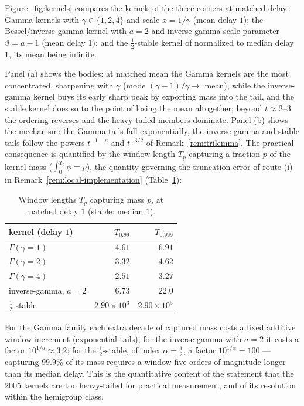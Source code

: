 \begin{example}\label{ex:tail-contrast}
Figure~\ref{fig:kernels} compares the kernels of the three corners at matched delay: Gamma
kernels with $\gamma \in \{1, 2, 4\}$ and scale $x = 1/\gamma$ (mean delay $1$); the
Bessel/inverse-gamma kernel with $a = 2$ and inverse-gamma scale parameter $\vartheta = a - 1$ (mean delay $1$); and the
$\tfrac12$-stable kernel of  normalized to median delay $1$,
its mean being infinite.


Panel (a) shows the bodies: at matched mean the Gamma kernels are the most concentrated,
sharpening with $\gamma$ (mode $(\gamma - 1)/\gamma \to$ mean), while the inverse-gamma
kernel buys its early sharp peak by exporting mass into the tail, and the stable kernel does
so to the point of losing the mean altogether; beyond $t \approx 2$--$3$ the ordering
reverses and the heavy-tailed members dominate. Panel (b) shows the mechanism: the Gamma
tails fall exponentially, the inverse-gamma and stable tails follow the powers $t^{-1-a}$ and
$t^{-3/2}$ of Remark~\ref{rem:trilemma}. The practical consequence is quantified by the
window length $T_p$ capturing a fraction $p$ of the kernel mass ($\int_0^{T_p}\phi = p$), the
quantity governing the truncation error of route (i) in
Remark~\ref{rem:local-implementation} (Table~\ref{tab:windows-mean}):

\begin{table}[t]
\centering
\caption{Window lengths $T_p$ capturing mass $p$, at matched delay $1$ (stable: median $1$).}
\label{tab:windows-mean}
\begin{tabular}{@{}lrr@{}}
\toprule
kernel (delay $1$) & $T_{0.99}$ & $T_{0.999}$ \\
\midrule
$\Gamma(\gamma{=}1)$ & $4.61$ & $6.91$ \\
$\Gamma(\gamma{=}2)$ & $3.32$ & $4.62$ \\
$\Gamma(\gamma{=}4)$ & $2.51$ & $3.27$ \\
inverse-gamma, $a = 2$ & $6.73$ & $22.0$ \\
$\tfrac12$-stable & $2.90 \times 10^{3}$ & $2.90 \times 10^{5}$ \\
\bottomrule
\end{tabular}
\end{table}

For the Gamma family each extra decade of captured mass costs a fixed additive window
increment (exponential tails); for the inverse-gamma with $a = 2$ it costs a factor
$10^{1/a} \approx 3.2$; for the $\tfrac12$-stable, of index $\alpha = \tfrac12$, a factor
$10^{1/\alpha} = 100$ --- capturing
$99.9\%$ of its mass requires a window five orders of magnitude longer than its median
delay. This is the quantitative content of the statement that the 2005 kernels are too
heavy-tailed for practical measurement, and of its resolution within the hemigroup class.


\end{example}
